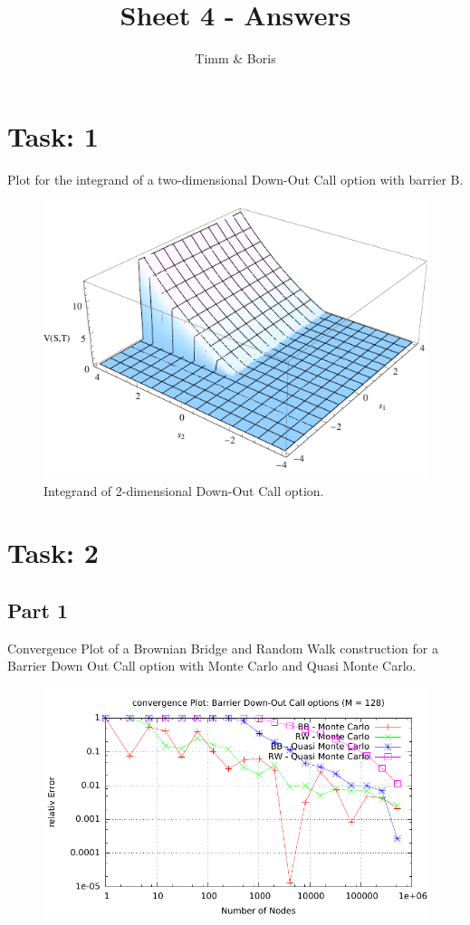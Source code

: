 \documentclass{article}
\title{Sheet 4 - Answers}
\author{Timm \& Boris}
\begin{document}
\maketitle

\section*{Task: 1}
Plot for the integrand of a two-dimensional Down-Out Call option with barrier B.
\begin{figure}[htbp]
  \centering
     \includegraphics[width=1.0\textwidth]{../Task01/task01_plot.pdf}
  \caption*{Integrand of 2-dimensional Down-Out Call option.}
\end{figure}

\newpage

\section*{Task: 2}
\subsection*{Part 1}
Convergence Plot of a Brownian Bridge and Random Walk construction for a Barrier Down Out Call option with Monte Carlo and Quasi Monte Carlo.
\begin{figure}[htbp]
  \centering
     \includegraphics[width=1.0\textwidth]{../Task02/sh4_task02_convergencePlot.pdf}
\end{figure}
\end{document}
